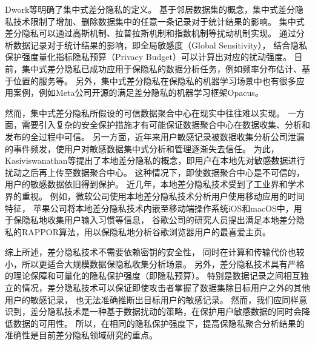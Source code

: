 Dwork等\cite{DBLP:conf/icalp/Dwork06}明确了集中式差分隐私的定义。
基于邻居数据集的概念，集中式差分隐私技术限制了增加、删除数据集中的任意一条记录对于统计结果的影响。
集中式差分隐私可以通过高斯机制\cite{nikolov2013geometry}、拉普拉斯机制\cite{dwork2006calibrating, dwork2016calibrating}和指数机制\cite{mcsherry2007mechanism}等扰动机制实现。
通过分析数据记录对于统计结果的影响，即全局敏感度（Global Sensitivity），
结合隐私保护强度量化指标隐私预算（Privacy Budget）可以计算出对应的扰动强度。
目前，集中式差分隐私已成功应用于保隐私的数据分析任务，例如频率分布估计\cite{hay2010boosting, zhang2014towards, acs2012differentially}、基于位置的服务\cite{andres2013geo, xiao2015protecting, hardt2010geometry}等。
另外，集中式差分隐私在保隐私的机器学习场景中也有很多应用案例\cite{abadi2016deep, 刘俊旭2020机器学习的隐私保护研究综述}，例如Meta公司开源的满足差分隐私的机器学习框架Opacus\cite{yousefpour2021opacus}。

然而，集中式差分隐私所假设的可信数据聚合中心在现实中往往难以实现。
一方面，需要引入复杂的安全保护措施才有可能保证数据聚合中心在数据收集、分析和发布的全过程中可信\cite{chen2017constrained, zhou2021node}。
另一方面，近年来用户敏感记录被数据收集分析公司泄漏的事件频发\cite{FacebookCohen2018, TribuneindiaKhaira2018, ConfidentialGreenbone2019}，使用户对敏感数据集中式分析和管理逐渐失去信任。
为此，Kasiviswanathan等\cite{kasiviswanathan2011can}提出了本地差分隐私的概念，即用户在本地先对敏感数据进行扰动之后再上传至数据聚合中心。
这种情况下，即使数据聚合中心是不可信的，用户的敏感数据依旧得到保护。
近几年，本地差分隐私技术受到了工业界和学术界的重视\cite{DBLP:conf/wsdm/KenthapadiMT19}。
例如，微软公司使用本地差分隐私技术分析用户使用移动应用的时间特征\cite{DBLP:conf/nips/DingKY17}，
苹果公司将本地差分隐私技术内嵌至移动端操作系统iOS和macOS中，用于保隐私地收集用户输入习惯等信息\cite{LearningDifferential2017}，
谷歌公司的研究人员提出满足本地差分隐私的RAPPOR算法，用以保隐私地分析谷歌浏览器用户的最喜爱主页\cite{DBLP:conf/ccs/ErlingssonPK14}。

综上所述，差分隐私技术不需要依赖密钥的安全性，
同时在计算和传输代价也较小，所以更适合大规模数据保隐私收集分析场景。
另外，差分隐私技术具有严格的理论保障和可量化的隐私保护强度（即隐私预算）。
特别是数据记录之间相互独立的情况，差分隐私技术可以保证即使攻击者掌握了数据集除目标用户之外的其他用户的敏感记录，
也无法准确推断出目标用户的敏感记录\cite{张啸剑2014面向数据发布和分析的差分隐私保护, 熊平2014差分隐私保护及其应用, 李杨2012差分隐私保护研究综述}。
然而，我们应同样意识到，差分隐私技术是一种基于数据扰动的策略，在保护用户敏感数据的同时会降低数据的可用性。
所以，在相同的隐私保护强度下，提高保隐私聚合分析结果的准确性是目前差分隐私领域研究的重点。



